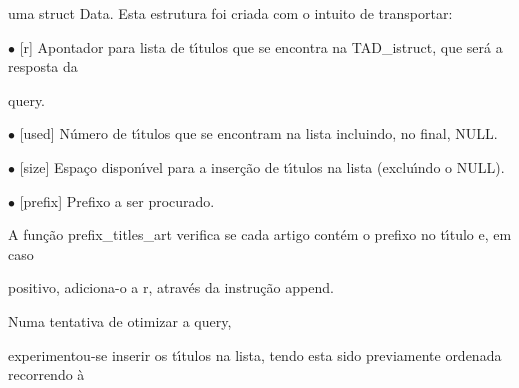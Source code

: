 \documentclass[a4paper,portrait,12pt]{article}
\begin{document}
\begin{flushleft}
uma struct Data. Esta estrutura foi criada com o intuito de transportar:
\end{flushleft}





\begin{flushleft}
$\bullet$ [r] Apontador para lista de t\i{}́tulos que se encontra na TAD\_istruct, que será a resposta da
\end{flushleft}


\begin{flushleft}
query.
\end{flushleft}


\begin{flushleft}
$\bullet$ [used] Número de t\i{}́tulos que se encontram na lista incluindo, no final, NULL.
\end{flushleft}


\begin{flushleft}
$\bullet$ [size] Espaço dispon\i{}́vel para a inserção de t\i{}́tulos na lista (exclu\i{}́ndo o NULL).
\end{flushleft}


\begin{flushleft}
$\bullet$ [prefix] Prefixo a ser procurado.
\end{flushleft}





\begin{flushleft}
A função prefix\_titles\_art verifica se cada artigo contém o prefixo no t\i{}́tulo e, em caso
\end{flushleft}


\begin{flushleft}
positivo, adiciona-o a r, através da instrução append.
\end{flushleft}





\begin{flushleft}
Numa tentativa de otimizar a query,
\end{flushleft}





\begin{flushleft}
experimentou-se inserir os t\i{}́tulos na lista, tendo esta sido previamente ordenada recorrendo à
\end{flushleft}
\end{document}
